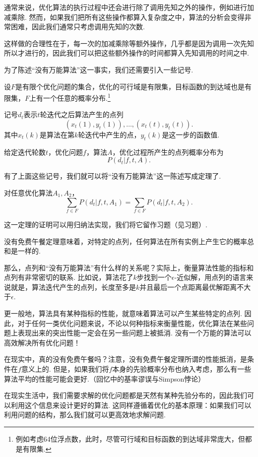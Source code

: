 \begin{remark}
    通常来说，优化算法的执行过程中还会进行除了调用先知之外的操作，例如进行加减乘除. 然而，如果我们把所有这些操作都算入复杂度之中，算法的分析会变得非常困难，因此我们通常只考虑调用先知的次数. 
    
    这样做的合理性在于，每一次的加减乘除等额外操作，几乎都是因为调用一次先知所以才进行的，因此我们可以把这些额外操作的时间都算入先知调用的时间之中. 
\end{remark}

为了陈述“没有万能算法”这一事实，我们还需要引入一些记号. 

设$F$是有限个优化问题的集合，优化的可行域是有限集，目标函数的到达域也是有限集，$F$上有一个任意的概率分布.\footnote{例如考虑64位浮点数，此时，尽管可行域和目标函数的到达域非常庞大，但都是有限集.}

记号$d_t$表示$t$轮迭代之后算法产生的点列
\[(x_t(1),y_t(1)),\dots,(x_t(t),y_t(t)).\]
其中$x_t(k)$是算法在第$k$轮迭代中产生的点，$y_t(k)$是这一步的函数值.

给定迭代轮数$t$，优化问题$f$，算法$A$，优化过程所产生的点列概率分布为
\[P(d_t|f,t,A).\]

有了上面这些记号，我们就可以将“没有万能算法”这一陈述写成定理了. 

\begin{theorem}[没有免费午餐定理]\label{thm:no-free-lunch}
对任意优化算法$A_1,A_2$，
    \[\sum_{f\in F} P(d_t|f,t,A_1)=\sum_{f\in F} P(d_t|f,t,A_2).\]
\end{theorem}

这一定理的证明可以用归纳法实现，我们将它留作习题（见习题）.

没有免费午餐定理意味着，对特定的点列，任何算法在所有实例上产生它的概率总和是一样的. 

那么，点列和“没有万能算法”有什么样的关系呢？实际上，衡量算法性能的指标和点列有非常密切的联系. 比如说，算法花了$k$步找到一个$\epsilon$-近似解，用点列的语言来说就是，算法迭代产生的点列，长度至多是$k$并且最后一个点距离最优解距离不大于$\epsilon$. 

更一般地，算法具有某种指标的性能，就意味着算法可以产生某些特定的点列. 因此，对于任何一类优化问题来说，不论以何种指标来衡量性能，优化算法在某些问题上表现出来的突出性能一定会在另一些问题上被抵消. 没有一个万能的算法可以高效解决所有优化问题！

\begin{remark}
    在现实中，真的没有免费午餐吗？注意，没有免费午餐定理所谓的性能抵消，是条件在$f$意义上的. 但是，如果我们将$f$本身的先验概率分布也纳入考虑，那么有一些算法平均的性能可能会更好.（回忆中的基率谬误与Simpson悖论）
    
    在现实生活中，我们需要求解的优化问题都是天然有某种先验分布的，因此我们可以利用这个信息来设计更好的算法. 这同样遵循着优化的基本原理：如果我们可以利用问题的结构，那么我们就可以更高效地求解问题.
\end{remark}

